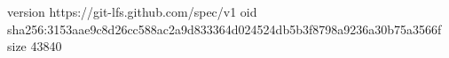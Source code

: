version https://git-lfs.github.com/spec/v1
oid sha256:3153aae9c8d26cc588ac2a9d833364d024524db5b3f8798a9236a30b75a3566f
size 43840

